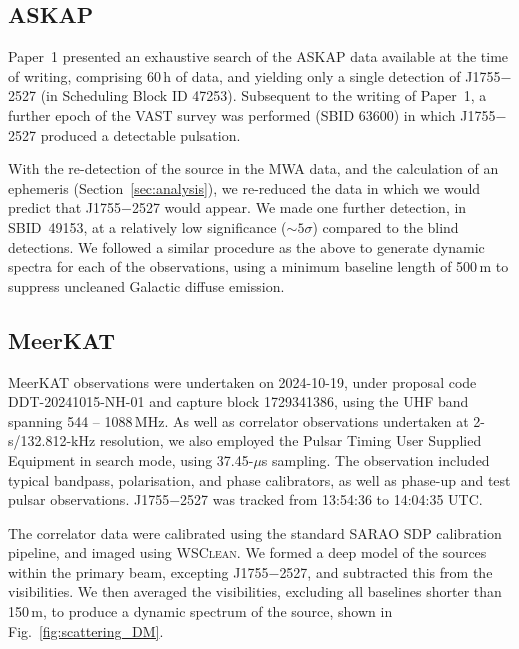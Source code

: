 \documentclass[preprint2,linenumbers]{aastex631}
\newcommand{\src}{J1755$-$2527}
\newcommand{\Fig}{Fig.}
\newcommand{\Sect}{Section}
\begin{document}
\subsection{ASKAP} \label{sec:askap}


Paper~1 presented an exhaustive search of the ASKAP data available at the time of writing, comprising 60\,h of data, and yielding only a single detection of \src{} (in Scheduling Block ID 47253). Subsequent to the writing of Paper~1, a further epoch of the VAST survey was performed (SBID 63600) in which \src{} produced a detectable pulsation.

With the re-detection of the source in the MWA data, and the calculation of an ephemeris (\Sect~\ref{sec:analysis}), we re-reduced the data in which we would predict that \src{} would appear. We made one further detection, in SBID~49153, at a relatively low significance ($\sim5\sigma$) compared to the blind detections. We followed a similar procedure as the above to generate dynamic spectra for each of the observations, using a minimum baseline length of 500\,m to suppress uncleaned Galactic diffuse emission.


\subsection{MeerKAT} \label{sec:meerkat}

MeerKAT observations were undertaken on 2024-10-19, under proposal code 
DDT-20241015-NH-01 and capture block 1729341386, using the UHF band spanning 544 -- 1088\,MHz. As well as correlator observations undertaken at 2-s/132.812-kHz resolution, we also employed the Pulsar Timing User Supplied Equipment \citep[PTUSE;][]{2020PASA...37...28B} in search mode, using 37.45-$\mu$s sampling. The observation included typical bandpass, polarisation, and phase calibrators, as well as phase-up and test pulsar observations. \src{} was tracked from 13:54:36 to 14:04:35 UTC.

The correlator data were calibrated using the standard SARAO SDP calibration pipeline, and imaged using \textsc{WSClean}. We formed a deep model of the sources within the primary beam, excepting \src{}, and subtracted this from the visibilities. We then averaged the visibilities, excluding all baselines shorter than 150\,m, to produce a dynamic spectrum of the source, shown in \Fig~\ref{fig:scattering_DM}.
\end{document}
